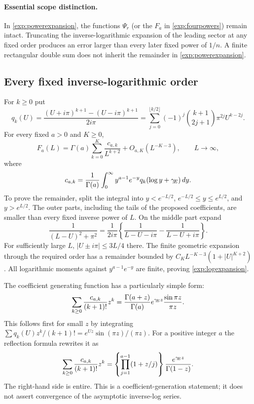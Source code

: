 \paragraph{Essential scope distinction.}
In \eqref{exp:powerexpansion}, the functions $\Psi_r$ (or the $F_a$ in
\eqref{exp:fourpowers}) remain intact. Truncating the inverse-logarithmic
expansion of the leading sector at any fixed order produces an error larger
than every later fixed power of $1/n$. A finite rectangular double sum does
not inherit the remainder in \eqref{exp:powerexpansion}.

\subsection{Every fixed inverse-logarithmic order}

For $k\geq0$ put
\[
 q_k(U)=\frac{(U+i\pi)^{k+1}-(U-i\pi)^{k+1}}{2i\pi}
       =\sum_{j=0}^{\lfloor k/2\rfloor}
          (-1)^j\binom{k+1}{2j+1}\pi^{2j}U^{k-2j}.
\]
For every fixed $a>0$ and $K\geq0$,
\begin{equation}\label{exp:logexpansion}
 F_a(L)=\Gamma(a)\sum_{k=0}^{K}\frac{c_{a,k}}{L^{k+2}}
                +O_{a,K}(L^{-K-3}),\qquad L\to\infty,
\end{equation}
where
\[
 c_{a,k}=\frac1{\Gamma(a)}\int_0^\infty
       y^{a-1}e^{-y}q_k(\log y+\gamma_{\!E})\,dy.
\]
To prove the remainder, split the integral into
$y<e^{-L/2}$, $e^{-L/2}\leq y\leq e^{L/2}$, and $y>e^{L/2}$.
The outer parts, including the tails of the proposed coefficients, are
smaller than every fixed inverse power of $L$.
On the middle part expand
\[
 \frac1{(L-U)^2+\pi^2}
 =\frac1{2i\pi}\left\{\frac1{L-U-i\pi}-\frac1{L-U+i\pi}\right\}.
\]
For sufficiently large $L$, $|U\pm i\pi|\leq3L/4$ there.
The finite geometric expansion through the required order has a remainder
bounded by $C_K L^{-K-3}(1+|U|^{K+2})$.
All logarithmic moments against $y^{a-1}e^{-y}$ are finite, proving
\eqref{exp:logexpansion}.

The coefficient generating function has a particularly simple form:
\begin{equation}\label{exp:coeffgen}
 \sum_{k\geq0}\frac{c_{a,k}}{(k+1)!}z^k
 =\frac{\Gamma(a+z)}{\Gamma(a)}e^{\gamma_{\!E} z}
          \frac{\sin\pi z}{\pi z}.
\end{equation}
This follows first for small $z$ by integrating
$\sum q_k(U)z^k/(k+1)!=e^{Uz}\sin(\pi z)/(\pi z)$.
For a positive integer $a$ the reflection formula rewrites it as
\[
 \sum_{k\geq0}\frac{c_{a,k}}{(k+1)!}z^k
 =\left\{\prod_{j=1}^{a-1}(1+z/j)\right\}
                       \frac{e^{\gamma_{\!E} z}}{\Gamma(1-z)}.
\]
The right-hand side is entire. This is a coefficient-generation statement;
it does not assert convergence of the asymptotic inverse-log series.

